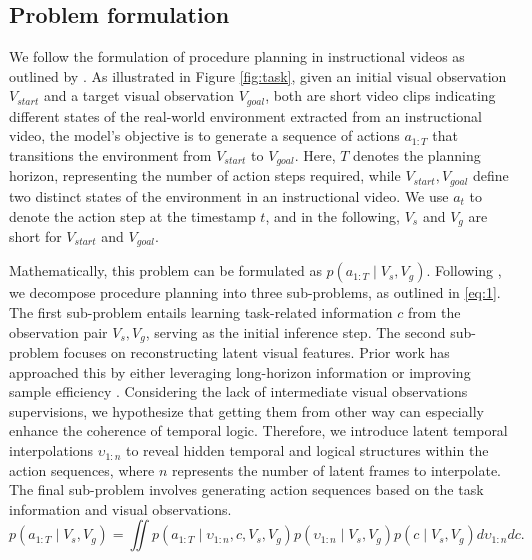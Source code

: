 \subsection{Problem formulation}
\label{method1}
We follow the formulation of procedure planning in instructional videos as outlined by \citet{chang2020procedure}. As illustrated in Figure \ref{fig:task}, given an initial visual observation $V_{start}$ and a target visual observation $V_{goal}$, both are short video clips indicating different states of the real-world environment extracted from an instructional video, the model's objective is to generate a sequence of actions $a_{1:T}$ that transitions the environment from $V_{start}$ to $V_{goal}$. Here, $T$ denotes the planning horizon, representing the number of action steps required, while ${V_{start}, V_{goal}}$ define two distinct states of the environment in an instructional video. We use $a_t$ to denote the action step at the timestamp $t$, and in the following, $V_s$ and $V_g$ are short for $V_{start}$ and $V_{goal}$. 


Mathematically, this problem can be formulated as $p(a_{1:T} \mid V_{s}, V_{g})$. Following \citet{wang2023pdpp}, we decompose procedure planning into three sub-problems, as outlined in \cref{eq:1}. The first sub-problem entails learning task-related information $c$ from the observation pair ${V_{s}, V_{g}}$, serving as the initial inference step. The second sub-problem focuses on reconstructing latent visual features. Prior work \citep{wang2023pdpp, bi2021procedure} has approached this by either leveraging long-horizon information \citep{bi2021procedure} or improving sample efficiency \citep{wang2023pdpp}. Considering the lack of intermediate visual observations supervisions, we hypothesize that getting them from other way can especially enhance the coherence of temporal logic. Therefore, we introduce latent temporal interpolations $\upsilon_{1:n}$ to reveal hidden temporal and logical structures within the action sequences, where $n$ represents the number of latent frames to interpolate. The final sub-problem involves generating action sequences based on the task information and visual observations.
\begin{equation} 
p(a_{1:T} \mid V_{s}, V_{g}) = \iint p(a_{1:T} \mid \upsilon_{1:n}, c, V_{s}, V_{g}) p(\upsilon_{1:n} \mid V_{s}, V_{g}) p(c \mid V_{s}, V_{g}) d\upsilon_{1:n} dc .
\label{eq:1} \end{equation}


